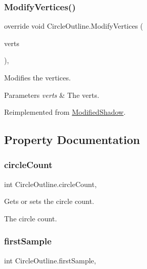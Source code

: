 \subsubsection{\texorpdfstring{Modify\+Vertices()}{ModifyVertices()}}
{\footnotesize\ttfamily override void Circle\+Outline.\+Modify\+Vertices (\begin{DoxyParamCaption}\item[{List$<$ U\+I\+Vertex $>$}]{verts }\end{DoxyParamCaption})\hspace{0.3cm}{\ttfamily [inline]}, {\ttfamily [virtual]}}



Modifies the vertices. 


\begin{DoxyParams}{Parameters}
{\em verts} & The verts.\\
\hline
\end{DoxyParams}


Reimplemented from \hyperlink{class_modified_shadow_ac1651effd229c1fd2f454eccc2cf225c}{Modified\+Shadow}.



\subsection{Property Documentation}
\mbox{\label{class_circle_outline_a9b716058213c2669cfadf143ce970c48}} 
\subsubsection{\texorpdfstring{circle\+Count}{circleCount}}
{\footnotesize\ttfamily int Circle\+Outline.\+circle\+Count\hspace{0.3cm}{\ttfamily [get]}, {\ttfamily [set]}}



Gets or sets the circle count. 

The circle count.\mbox{\label{class_circle_outline_aadda26b329945bc2a1fb1d96cf0e7515}} 
\subsubsection{\texorpdfstring{first\+Sample}{firstSample}}
{\footnotesize\ttfamily int Circle\+Outline.\+first\+Sample\hspace{0.3cm}{\ttfamily [get]}, {\ttfamily [set]}}



